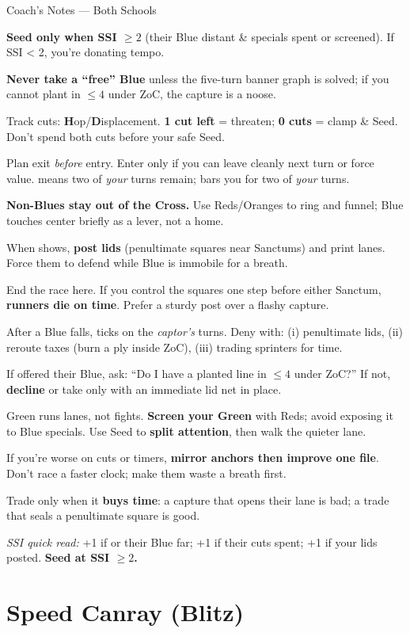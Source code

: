\documentclass[11pt]{article}
\newcommand{\CC}[1]{\textcolor{blue!60!black}{\scriptsize\ttfamily[CF:#1]}}
\newcommand{\RoC}{\textcolor{teal!60!black}{\scriptsize\ttfamily[Rooted]}}
\newcommand{\RC}{\textcolor{purple!70!black}{\scriptsize\ttfamily[RC]}}
\newenvironment{coachnotes}[1]{%
  \begin{coachbox}{#1}%
    \footnotesize
    \begin{description}[leftmargin=2.8cm,labelsep=0.6em,font=\scshape,
                        itemsep=0.25em,parsep=0pt,topsep=0.2em]
}{%
    \end{description}%
  \end{coachbox}%
}
\newcommand{\CNRow}[2]{\item[#1] #2}
\renewcommand{\RC}[1][]{%
  \textcolor{purple!70!black}{\scriptsize\ttfamily[RC%
  \if\relax\detokenize{#1}\relax\else~#1\fi]}}
\begin{document}
\begin{coachnotes}{Coach’s Notes — Both Schools}
  \CNRow{Seed discipline}{\textbf{Seed only when SSI $\ge 2$} (their Blue distant \& specials spent or screened). If SSI < 2, you’re donating tempo.}
  \CNRow{“Free” Blue test}{\textbf{Never take a “free” Blue} unless the five-turn banner graph is solved; if you cannot plant in $\le 4$ under ZoC, the capture is a noose.}
  \CNRow{Blue specials}{Track cuts: \textbf{H}op/\textbf{D}isplacement. \textbf{1 cut left} = threaten; \textbf{0 cuts} = clamp \& Seed. Don’t spend both cuts before your safe Seed.}
  \CNRow{Cross math}{Plan exit \emph{before} entry. Enter only if you can leave cleanly next turn or force value. \CC{in 1/3} means two of \emph{your} turns remain; \CC{ex 1/2} bars you for two of \emph{your} turns.}
  \CNRow{Ring over Cross}{\textbf{Non-Blues stay out of the Cross.} Use Reds/Oranges to ring and funnel; Blue touches center briefly as a lever, not a home.}
  \CNRow{Rooted punish}{When \RoC{} shows, \textbf{post lids} (penultimate squares near Sanctums) and print lanes. Force them to defend while Blue is immobile for a breath.}
  \CNRow{Penultimate squares}{End the race here. If you control the squares one step before either Sanctum, \textbf{runners die on time}. Prefer a sturdy post over a flashy capture.}
  \CNRow{Reforge denial}{After a Blue falls, \RC{} ticks on the \emph{captor’s} turns. Deny with: (i) penultimate lids, (ii) reroute taxes (burn a ply inside ZoC), (iii) trading sprinters for time.}
  \CNRow{Poison capture}{If offered their Blue, ask: “Do I have a planted line in $\le 4$ under ZoC?” If not, \textbf{decline} or take only with an immediate lid net in place.}
  \CNRow{Green usage}{Green runs lanes, not fights. \textbf{Screen your Green} with Reds; avoid exposing it to Blue specials. Use Seed to \textbf{split attention}, then walk the quieter lane.}
  \CNRow{Mirror rule}{If you’re worse on cuts or timers, \textbf{mirror anchors then improve one file}. Don’t race a faster clock; make them waste a breath first.}
  \CNRow{Tempo trades}{Trade only when it \textbf{buys time}: a capture that opens their lane is bad; a trade that seals a penultimate square is good.}
\end{coachnotes}

{\footnotesize\textit{SSI quick read:} +1 if \CC{ex 1/2} or their Blue far; +1 if their cuts spent; +1 if your lids posted. \textbf{Seed at SSI $\ge2$.}}

\clearpage

\section{Speed Canray (Blitz)}
\end{document}
